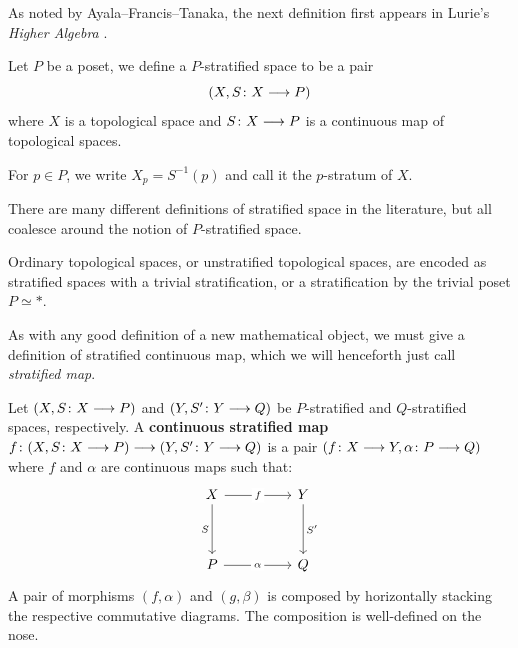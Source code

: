 As noted by Ayala--Francis--Tanaka, the next definition first appears in Lurie's \emph{Higher Algebra} \cite[Appendix~A.5]{LurieHA}. 

\begin{definition}\label{ch4:: def: p-stratified space}
    Let $P$ be a poset, we define a $P$-stratified space to be a pair 
    \begin{equation}
        (X,S\colon X \longrightarrow P)
    \end{equation} where $X$ is a topological space and $S\colon X \longrightarrow P$ is a continuous map of topological spaces. 
\end{definition}

For $p\in P$, we write $X_p=S^{-1}(p)$ and call it the $p$-stratum of $X$.

\begin{observation}
There are many different definitions of stratified space in the literature, but all coalesce around the notion of $P$-stratified space. 
\end{observation}


\begin{observation}
    Ordinary topological spaces, or unstratified topological spaces, are encoded as stratified spaces with a trivial stratification, or a stratification by the trivial poset $P\simeq *$.
\end{observation}

As with any good definition of a new mathematical object, we must give a definition of stratified continuous map, which we will henceforth just call \emph{stratified map}. 
\begin{definition}\label{ch4:: def: stratified map}
    Let $(X, S\colon X \longrightarrow P)$ and $(Y, S'\colon Y \longrightarrow Q)$ be $P$-stratified and $Q$-stratified spaces, respectively. A \textbf{continuous stratified map} $f \colon (X,S\colon X \longrightarrow P ) \longrightarrow (Y,S'\colon Y \longrightarrow Q)$ is a pair $(f \colon X \longrightarrow Y, \alpha\colon P \longrightarrow Q)$ where $f$ and $\alpha$ are continuous maps such that: 
    \begin{equation}
        \begin{tikzcd}[ampersand replacement=\&]
            X \&\& Y \\
            \\
            P \&\& Q
            \arrow["f"{description}, from=1-1, to=1-3]
            \arrow["S"', from=1-1, to=3-1]
            \arrow["{S'}", from=1-3, to=3-3]
            \arrow["\alpha"{description}, from=3-1, to=3-3]
        \end{tikzcd}
    \end{equation}
    A pair of morphisms $(f,\alpha)$ and $(g,\beta)$ is composed by horizontally stacking the respective commutative diagrams. The composition is well-defined on the nose.
\end{definition}


